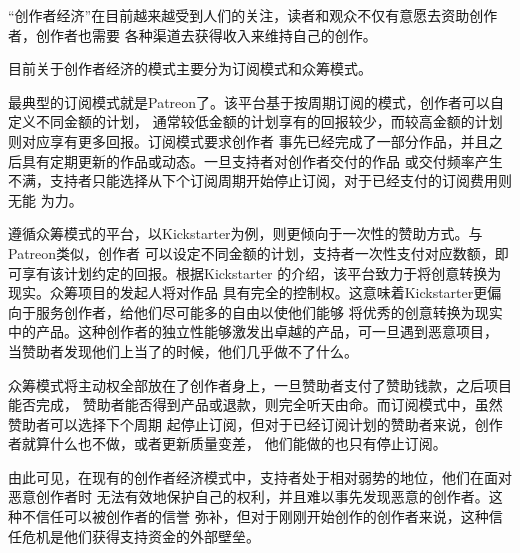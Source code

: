 “创作者经济”在目前越来越受到人们的关注，读者和观众不仅有意愿去资助创作者，创作者也需要
各种渠道去获得收入来维持自己的创作。

目前关于创作者经济的模式主要分为订阅模式和众筹模式。

最典型的订阅模式就是Patreon了。该平台基于按周期订阅的模式，创作者可以自定义不同金额的计划，
通常较低金额的计划享有的回报较少，而较高金额的计划则对应享有更多回报。订阅模式要求创作者
事先已经完成了一部分作品，并且之后具有定期更新的作品或动态。一旦支持者对创作者交付的作品
或交付频率产生不满，支持者只能选择从下个订阅周期开始停止订阅，对于已经支付的订阅费用则无能
为力。

遵循众筹模式的平台，以Kickstarter为例，则更倾向于一次性的赞助方式。与Patreon类似，创作者
可以设定不同金额的计划，支持者一次性支付对应数额，即可享有该计划约定的回报。根据Kickstarter
的介绍\cite{kickstarter_about}，该平台致力于将创意转换为现实。众筹项目的发起人将对作品
具有完全的控制权。这意味着Kickstarter更偏向于服务创作者，给他们尽可能多的自由以使他们能够
将优秀的创意转换为现实中的产品。这种创作者的独立性能够激发出卓越的产品，可一旦遇到恶意项目，
当赞助者发现他们上当了的时候，他们几乎做不了什么。

众筹模式将主动权全部放在了创作者身上，一旦赞助者支付了赞助钱款，之后项目能否完成，
赞助者能否得到产品或退款，则完全听天由命。而订阅模式中，虽然赞助者可以选择下个周期
起停止订阅，但对于已经订阅计划的赞助者来说，创作者就算什么也不做，或者更新质量变差，
他们能做的也只有停止订阅。

由此可见，在现有的创作者经济模式中，支持者处于相对弱势的地位，他们在面对恶意创作者时
无法有效地保护自己的权利，并且难以事先发现恶意的创作者。这种不信任可以被创作者的信誉
弥补，但对于刚刚开始创作的创作者来说，这种信任危机是他们获得支持资金的外部壁垒。